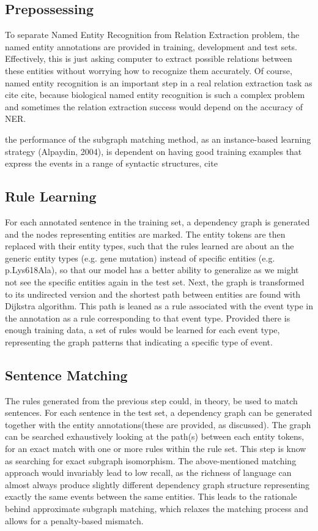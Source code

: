 \subsection{Prepossessing}
To separate Named Entity Recognition from Relation Extraction problem, the named entity annotations are provided in training, development and test sets. Effectively, this is just asking computer to extract possible relations between these entities without worrying how to recognize them accurately. Of course, named entity recognition is an important step in a real relation extraction task as cite cite, because biological named entity recognition is such a complex problem and sometimes the relation extraction success would depend on the accuracy of NER.

the performance of the subgraph matching method, as an instance-based learning strategy (Alpaydin, 2004), is dependent on having good training examples that express the events in a range of syntactic structures, cite
\subsection{Rule Learning}
For each annotated sentence in the training set, a dependency graph is generated and the nodes representing entities are marked. The entity tokens are then replaced with their entity types, such that the rules learned are about an the generic entity types (e.g. gene mutation) instead of specific entities (e.g. p.Lys618Ala), so that our model has a better ability to generalize as we might not see the specific entities again in the test set. Next, the graph is transformed to its undirected version and the shortest path between entities are found with Dijkstra algorithm. This path is leaned as a rule associated with the event type in the annotation as a rule corresponding to that event type. Provided there is enough training data, a set of rules would be learned for each event type, representing the graph patterns that indicating a specific type of event. 
\subsection{Sentence Matching}
The rules generated from the previous step could, in theory, be used to match sentences. For each sentence in the test set, a dependency graph can be generated together with the entity annotations(these are provided, as discussed). The graph can be searched exhaustively looking at the path(s) between each entity tokens, for an exact match with one or more rules within the rule set. This step is know as searching for exact subgraph isomorphism. \newline
The above-mentioned matching approach would invariably lead to low recall, as the richness of language can almost always produce slightly different dependency graph structure representing exactly the same events between the same entities. This leads to the rationale behind approximate subgraph matching, which relaxes the matching process and allows for a penalty-based mismatch. 
